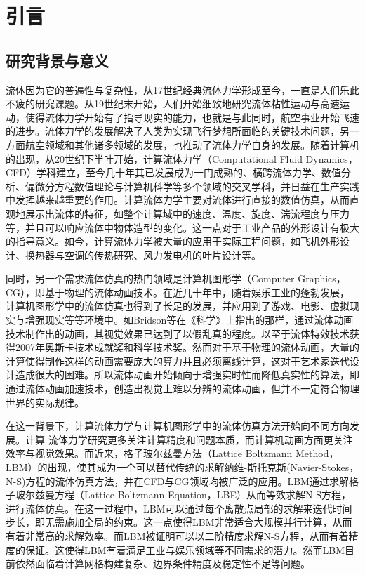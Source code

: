 \chapter{引言}

\section{研究背景与意义}
流体因为它的普遍性与复杂性，从17世纪经典流体力学形成至今，一直是人们乐此不疲的研究课题。从19世纪末开始，人们开始细致地研究流体粘性运动与高速运动，使得流体力学开始有了指导现实的能力，也就是与此同时，航空事业开始飞速的进步。流体力学的发展解决了人类为实现飞行梦想所面临的关键技术问题，另一方面航空领域和其他诸多领域的发展，也推动了流体力学自身的发展。随着计算机的出现，从20世纪下半叶开始，计算流体力学（Computational Fluid Dynamics，CFD）学科建立，至今几十年其已发展成为一门成熟的、横跨流体力学、数值分析、偏微分方程数值理论与计算机科学等多个领域的交叉学科，并日益在生产实践中发挥越来越重要的作用。计算流体力学主要对流体进行直接的数值仿真，从而直观地展示出流体的特征，如整个计算域中的速度、温度、旋度、湍流程度与压力等，并且可以响应流体中物体造型的变化。这一点对于工业产品的外形设计有极大的指导意义。如今，计算流体力学被大量的应用于实际工程问题，如飞机外形设计、换热器与空调的传热研究、风力发电机的叶片设计等。

同时，另一个需求流体仿真的热门领域是计算机图形学（Computer Graphics，CG），即基于物理的流体动画技术。在近几十年中，随着娱乐工业的蓬勃发展，计算机图形学中的流体仿真也得到了长足的发展，并应用到了游戏、电影、虚拟现实与增强现实等等环境中。如Bridson等在《科学》上指出的那样，通过流体动画技术制作出的动画，其视觉效果已达到了以假乱真的程度。以至于流体特效技术获得2007年奥斯卡技术成就奖和科学技术奖。然而对于基于物理的流体动画，大量的计算使得制作这样的动画需要庞大的算力并且必须离线计算，这对于艺术家迭代设计造成很大的困难。所以流体动画开始倾向于增强实时性而降低真实性的算法，即通过流体动画加速技术，创造出视觉上难以分辨的流体动画，但并不一定符合物理世界的实际规律。

在这一背景下，计算流体力学与计算机图形学中的流体仿真方法开始向不同方向发展。计算
流体力学研究更多关注计算精度和问题本质，而计算机动画方面更关注效率与视觉效果。而近来，格子玻尔兹曼方法（Lattice Boltzmann Method，LBM）的出现，使其成为一个可以替代传统的求解纳维-斯托克斯(Navier-Stokes，N-S)方程的流体仿真方法，并在CFD与CG领域均被广泛的应用。LBM通过求解格子玻尔兹曼方程（Lattice Boltzmann Equation，LBE）从而等效求解N-S方程，进行流体仿真。在这一过程中，LBM可以通过每个离散点局部的求解来迭代时间步长，即无需施加全局的约束。这一点使得LBM非常适合大规模并行计算，从而有着非常高的求解效率。而LBM被证明可以以二阶精度求解N-S方程，从而有着精度的保证。这使得LBM有着满足工业与娱乐领域等不同需求的潜力。然而LBM目前依然面临着计算网格构建复杂、边界条件精度及稳定性不足等问题。

